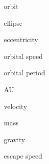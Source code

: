 \documentclass{article}
\begin{document}
\gls{orbit}

\gls{ellipse}

\gls{eccentricity}

\gls{orbital speed}

\gls{orbital period}

\Gls{AU}

\gls{velocity}

\gls{mass}

\gls{gravity}

\gls{escape speed}


\clearpage

\printglossaries
\end{document}
